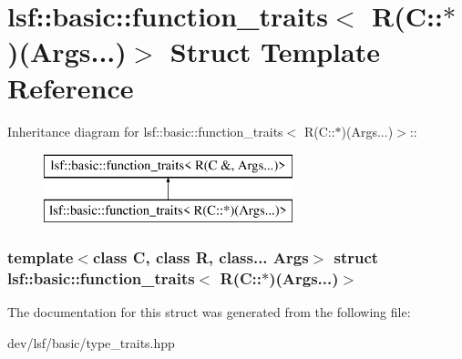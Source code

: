 \hypertarget{structlsf_1_1basic_1_1function__traits_3_01R_07C_1_1_5_08_07Args_8_8_8_08_4}{
\section{lsf::basic::function\_\-traits$<$ R(C::$\ast$)(Args...)$>$ Struct Template Reference}
\label{structlsf_1_1basic_1_1function__traits_3_01R_07C_1_1_5_08_07Args_8_8_8_08_4}
}
Inheritance diagram for lsf::basic::function\_\-traits$<$ R(C::$\ast$)(Args...)$>$::\begin{figure}[H]
\begin{center}
\leavevmode
\includegraphics[height=2cm]{structlsf_1_1basic_1_1function__traits_3_01R_07C_1_1_5_08_07Args_8_8_8_08_4}
\end{center}
\end{figure}
\subsubsection*{template$<$class C, class R, class... Args$>$ struct lsf::basic::function\_\-traits$<$ R(C::$\ast$)(Args...)$>$}



The documentation for this struct was generated from the following file:\begin{DoxyCompactItemize}
\item 
dev/lsf/basic/type\_\-traits.hpp\end{DoxyCompactItemize}

